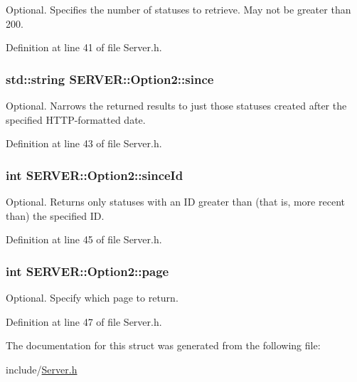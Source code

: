 Optional. Specifies the number of statuses to retrieve. May not be greater than 200. 



Definition at line 41 of file Server.h.\hypertarget{structSERVER_1_1Option2_a5f812a1c4b4a757204e187a90a99d92}{
\subsubsection{\setlength{\rightskip}{0pt plus 5cm}std::string {\bf SERVER::Option2::since}}}
\label{structSERVER_1_1Option2_a5f812a1c4b4a757204e187a90a99d92}


Optional. Narrows the returned results to just those statuses created after the specified HTTP-formatted date. 



Definition at line 43 of file Server.h.\hypertarget{structSERVER_1_1Option2_42cf95d44c8dee885c20570746b52cfa}{
\subsubsection{\setlength{\rightskip}{0pt plus 5cm}int {\bf SERVER::Option2::sinceId}}}
\label{structSERVER_1_1Option2_42cf95d44c8dee885c20570746b52cfa}


Optional. Returns only statuses with an ID greater than (that is, more recent than) the specified ID. 



Definition at line 45 of file Server.h.\hypertarget{structSERVER_1_1Option2_e5527a71b27b55dfbf1dc2a0847a1b98}{
\subsubsection{\setlength{\rightskip}{0pt plus 5cm}int {\bf SERVER::Option2::page}}}
\label{structSERVER_1_1Option2_e5527a71b27b55dfbf1dc2a0847a1b98}


Optional. Specify which page to return. 



Definition at line 47 of file Server.h.

The documentation for this struct was generated from the following file:\begin{CompactItemize}
\item 
include/\hyperlink{Server_8h}{Server.h}\end{CompactItemize}
